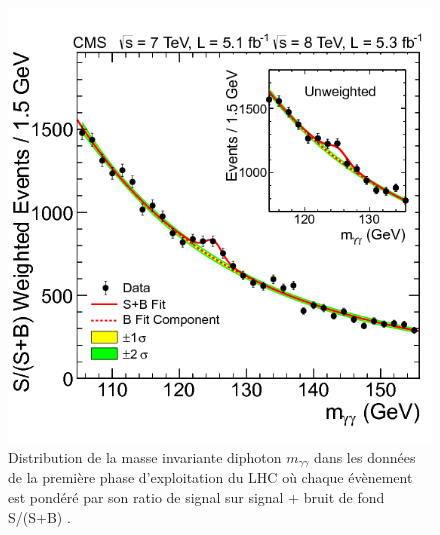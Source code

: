 \begin{figure}
\centering
    \includegraphics[scale=0.4]{Chapitre5/Images/Hgammagamma.png} 
    \caption{Distribution de la masse invariante diphoton $m_{\gamma\gamma}$ dans les données de la première phase d'exploitation du LHC où chaque évènement est pondéré par son ratio de signal sur signal + bruit de fond S/(S+B) \cite{higgsCMS1}.}
    \label{higgsGG}
\end{figure}

